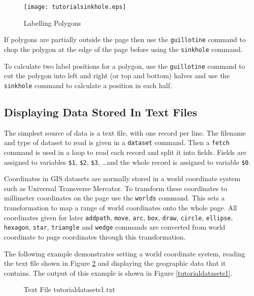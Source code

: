 

\begin{figure}[htb]
\texttt{[image: tutorialsinkhole.eps]}
\caption{Labelling Polygons}
\label{tutorialsinkhole}
\end{figure}

If polygons are partially outside the page then
use the \texttt{guillotine} command to chop the
polygon at the edge of the page before using the \texttt{sinkhole}
command.

To calculate two label positions for a polygon, use the \texttt{guillotine}
command to cut the polygon into left and right (or top and bottom)
halves and use the \texttt{sinkhole} command to calculate a
position in each half.

\subsection{Displaying Data Stored In Text Files}

The simplest source of data is a text file, with one record per line.  The
filename and type of dataset to read is given in a \texttt{dataset} command.
Then a \texttt{fetch} command is used in a loop to read each record
and split it into fields.
Fields are assigned to variables
\texttt{\$1}, \texttt{\$2}, \texttt{\$3}, \dots and the whole record is
assigned to variable \texttt{\$0}.

Coordinates in GIS datasets are normally stored
in a world coordinate system such as
Universal Transverse Mercator.  To transform these coordinates to millimeter
coordinates on the page use the \texttt{worlds} command.  This sets a
transformation to map a range of world coordinates onto the whole page.  All
coordinates given for later \texttt{addpath}, \texttt{move}, \texttt{arc},
\texttt{box},
\texttt{draw},
\texttt{circle},
\texttt{ellipse},
\texttt{hexagon},
\texttt{star},
\texttt{triangle}
and
\texttt{wedge}
commands are converted from world coordinate to page coordinates
through this transformation.

The following example demonstrates
setting a world coordinate system,
reading the text file shown in Figure
\ref{tutorialdatasets1txt} and displaying the
geographic data that it contains.  The output of this example is shown in
Figure \ref{tutorialdatasets1}.

\begin{figure}[htb]

\caption{Text File tutorialdatasets1.txt}
\label{tutorialdatasets1txt}
\end{figure}

